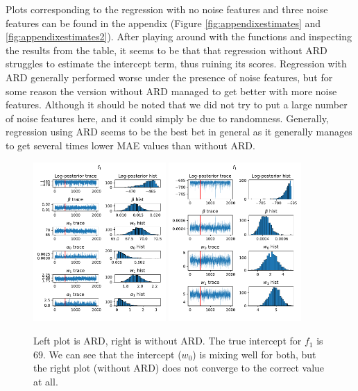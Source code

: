 \documentclass[12pt]{article}
\begin{document}
        Plots corresponding to the regression with no noise features and three noise features can be found in the appendix (Figure \ref{fig:appendixestimates} and \ref{fig:appendixestimates2}). After playing around with the functions and inspecting the results from the table, it seems to be that that regression without ARD struggles to estimate the intercept term, thus ruining its scores. Regression with ARD generally performed worse under the presence of noise features, but for some reason the version without ARD managed to get better with more noise features. Although it should be noted that we did not try to put a large number of noise features here, and it could simply be due to randomness. Generally, regression using ARD seems to be the best bet in general as it generally manages to get several times lower MAE values than without ARD. 

        \begin{figure}[H]
            \centering
            \includegraphics[width=0.45\textwidth]{f_1_noise0_tplot_ard.pdf}
            \includegraphics[width=0.45\textwidth]{f_1_noise0_tplot_reg.pdf}
            \caption{Left plot is ARD, right is without ARD. The true intercept for $f_1$ is $69$. We can see that the intercept ($w_0$) is mixing well for both, but the right plot (without ARD) does not converge to the correct value at all.}
        \end{figure}
\end{document}
